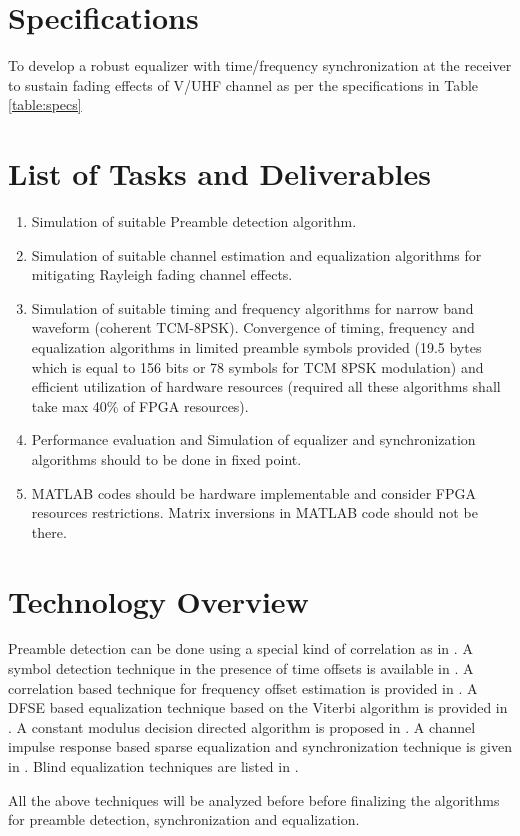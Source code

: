 \documentclass[journal,12pt,onecolumn]{IEEEtran}
\begin{document}
\section{Specifications}
To develop a robust equalizer with time/frequency synchronization at the receiver to  sustain fading effects of
V/UHF channel as per the  specifications in Table \ref{table:specs}
\begin{table}
\centering

\caption{}
\label{table:specs}
\end{table}


\section{List of Tasks and Deliverables}
\begin{enumerate}

\item Simulation of suitable Preamble detection algorithm.
\item Simulation of suitable channel estimation and equalization algorithms for mitigating Rayleigh fading channel effects.
\item  Simulation of suitable timing and frequency algorithms for narrow band waveform (coherent TCM-8PSK). Convergence of timing, frequency and equalization algorithms in limited preamble symbols provided (19.5 bytes which is equal to 156 bits or 78 symbols for  TCM 8PSK modulation) and efficient utilization of hardware resources (required all these algorithms shall take max 40\% of FPGA resources).
\item Performance evaluation and Simulation of equalizer and synchronization algorithms should to be done in fixed point.
\item MATLAB codes should be hardware implementable and consider FPGA resources restrictions. Matrix inversions in MATLAB code should not be there.

\end{enumerate}


\section{Technology Overview}
Preamble detection can be done using a special kind of correlation as in \cite{frame_offset}.  A symbol detection technique in the presence of time offsets is available in \cite{time_offset}.  A correlation based technique for frequency offset estimation is provided in \cite{freq_offset}. A DFSE based equalization technique based on the Viterbi algorithm is provided in \cite{dfse_viterbi}. A constant modulus decision directed algorithm is proposed in \cite{cmdd}. A channel impulse response based sparse equalization and synchronization technique is given in \cite{cir_sparse}.  Blind equalization techniques are listed in \cite{blind}.

All the above techniques will be analyzed before before finalizing the algorithms for preamble detection, synchronization and equalization.

\end{document}
